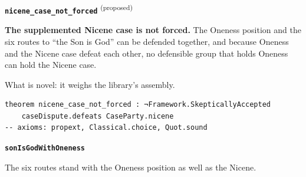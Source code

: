 \documentclass[11pt,paper=\testimonypaper,DIV=13,parskip=false]{scrartcl}
\begin{document}
\par\medskip\noindent\textbf{\texttt{nicene\_\allowbreak{}case\_\allowbreak{}not\_\allowbreak{}forced}} \textsuperscript{(proposed)}\par\nobreak\noindent
\textbf{The supplemented Nicene case is not forced.} The Oneness position and the six routes to “the Son is God” can be defended together, and because Oneness and the Nicene case defeat each other, no defensible group that holds Oneness can hold the Nicene case.

What is novel: it weighs the library’s assembly.

{\small\begin{verbatim}
theorem nicene_case_not_forced : ¬Framework.SkepticallyAccepted
    caseDispute.defeats CaseParty.nicene
-- axioms: propext, Classical.choice, Quot.sound
\end{verbatim}}
\par\medskip\noindent\textbf{\texttt{son\allowbreak{}Is\allowbreak{}God\allowbreak{}With\allowbreak{}Oneness}}\par\nobreak\noindent
The six routes stand with the Oneness position as well as the Nicene.
\end{document}
